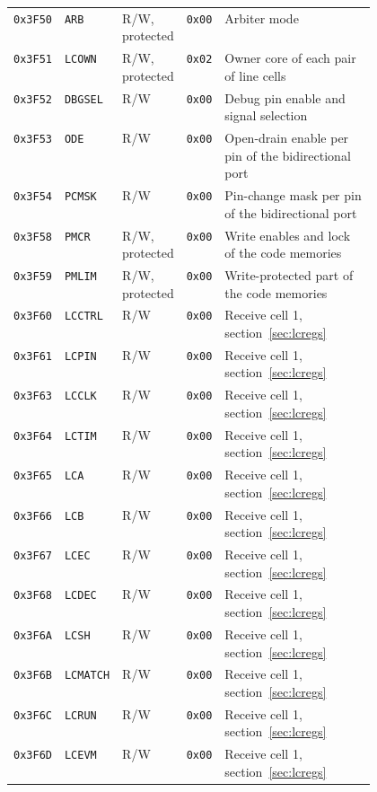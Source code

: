 \begin{longtable}{@{}llllp{0.47\linewidth}@{}}
\midrule
\texttt{0x3F50} & \texttt{ARB} & R/W, protected & \texttt{0x00} & Arbiter mode \\
\texttt{0x3F51} & \texttt{LCOWN} & R/W, protected & \texttt{0x02} & Owner core of each pair of line cells \\
\texttt{0x3F52} & \texttt{DBGSEL} & R/W & \texttt{0x00} & Debug pin enable and signal selection \\
\texttt{0x3F53} & \texttt{ODE} & R/W & \texttt{0x00} & Open-drain enable per pin of the bidirectional port \\
\texttt{0x3F54} & \texttt{PCMSK} & R/W & \texttt{0x00} & Pin-change mask per pin of the bidirectional port \\
\midrule
\texttt{0x3F58} & \texttt{PMCR} & R/W, protected & \texttt{0x00} & Write enables and lock of the code memories \\
\texttt{0x3F59} & \texttt{PMLIM} & R/W, protected & \texttt{0x00} & Write-protected part of the code memories \\
\midrule
\texttt{0x3F60} & \texttt{LCCTRL} & R/W & \texttt{0x00} & Receive cell 1, section~\ref{sec:lcregs} \\
\texttt{0x3F61} & \texttt{LCPIN} & R/W & \texttt{0x00} & Receive cell 1, section~\ref{sec:lcregs} \\
\texttt{0x3F63} & \texttt{LCCLK} & R/W & \texttt{0x00} & Receive cell 1, section~\ref{sec:lcregs} \\
\texttt{0x3F64} & \texttt{LCTIM} & R/W & \texttt{0x00} & Receive cell 1, section~\ref{sec:lcregs} \\
\texttt{0x3F65} & \texttt{LCA} & R/W & \texttt{0x00} & Receive cell 1, section~\ref{sec:lcregs} \\
\texttt{0x3F66} & \texttt{LCB} & R/W & \texttt{0x00} & Receive cell 1, section~\ref{sec:lcregs} \\
\texttt{0x3F67} & \texttt{LCEC} & R/W & \texttt{0x00} & Receive cell 1, section~\ref{sec:lcregs} \\
\texttt{0x3F68} & \texttt{LCDEC} & R/W & \texttt{0x00} & Receive cell 1, section~\ref{sec:lcregs} \\
\texttt{0x3F6A} & \texttt{LCSH} & R/W & \texttt{0x00} & Receive cell 1, section~\ref{sec:lcregs} \\
\texttt{0x3F6B} & \texttt{LCMATCH} & R/W & \texttt{0x00} & Receive cell 1, section~\ref{sec:lcregs} \\
\texttt{0x3F6C} & \texttt{LCRUN} & R/W & \texttt{0x00} & Receive cell 1, section~\ref{sec:lcregs} \\
\texttt{0x3F6D} & \texttt{LCEVM} & R/W & \texttt{0x00} & Receive cell 1, section~\ref{sec:lcregs} \\

\end{longtable}
